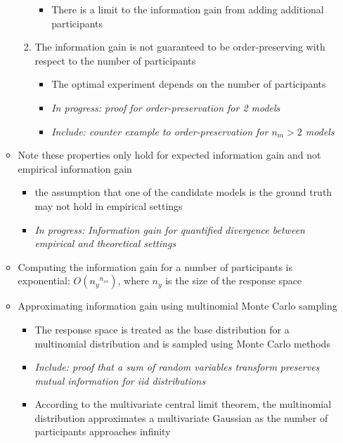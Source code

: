 \documentclass[11pt]{article}
\begin{document}
\begin{itemize}
\begin{itemize}
\begin{enumerate}
\begin{itemize}
                                \item There is a limit to the information gain from adding additional participants 
                            \end{itemize}
                        \item The information gain is not guaranteed to be order-preserving with respect to the number of participants
                            \begin{itemize}
                                \item The optimal experiment depends on the number of participants
                                \item \emph{In progress: proof for order-preservation for 2 models}
                                \item \emph{Include: counter example to order-preservation for $n_m > 2$ models}
                            \end{itemize}
                    \end{enumerate}
                \item Note these properties only hold for expected information gain and not empirical information gain
                    \begin{itemize}
                        \item the assumption that one of the candidate models is the ground truth may not hold in empirical settings
                        \item \emph{In progress: Information gain for quantified divergence between empirical and theoretical settings}
                    \end{itemize}
                \item Computing the information gain for a number of participants is exponential: $O({n_y}^{n_{ss}})$, where $n_y$ is the size of the response space
                \item Approximating information gain using multinomial Monte Carlo sampling
                    \begin{itemize}
                        \item The response space is treated as the base distribution for a multinomial distribution and is sampled using Monte Carlo methods
                        \item \emph{Include: proof that a sum of random variables transform preserves mutual information for iid distributions}
                        \item According to the multivariate central limit theorem, the multinomial distribution approximates a multivariate Gaussian as the number of participants approaches infinity

\end{itemize}
\end{itemize}
\end{itemize}
\end{document}
